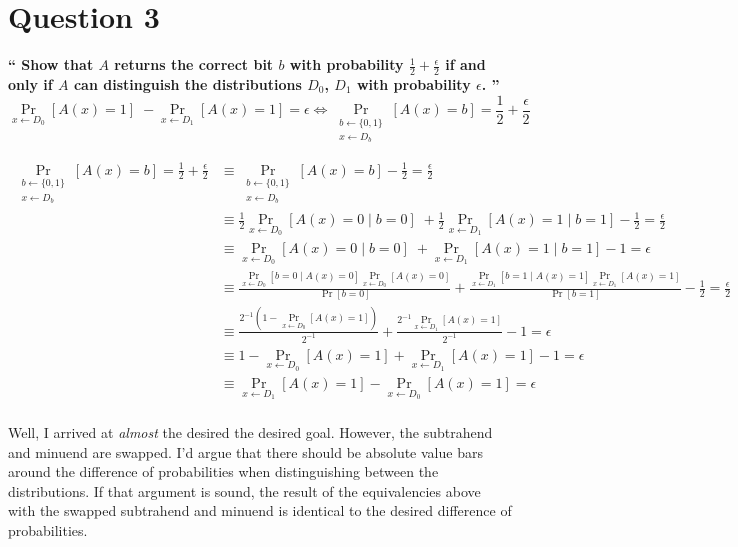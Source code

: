 \documentclass{article}
\newcommand{\HomeworkText}[1]{\textbf{``#1''}\\}
\begin{document}
	\clearpage
	\section*{Question 3}
	\HomeworkText{
		Show that $A$ returns the correct bit $b$ with probability $\frac{1}{2} + \frac{\epsilon}{2}$ if and only if $A$ can distinguish the distributions $D_0$, $D_1$ with probability $\epsilon$.
	}

    $$\underset{ x \gets D_0}{\Pr}[A(x) = 1] \;- \underset{ x \gets D_1}{\Pr}[A(x) = 1] = \epsilon \iff \underset{\substack{ b \gets \{0,1\}\\x \gets D_b}}{\Pr}[ A(x) = b] = \frac{1}{2} + \frac{\epsilon}{2}$$
    
    \begin{equation}
    \begin{split}
    \underset{\substack{ b \gets \{0,1\}\\x \gets D_b}}{\Pr}[ A(x) = b] = \frac{1}{2} + \frac{\epsilon}{2} & \equiv \underset{\substack{ b \gets \{0,1\}\\x \gets D_b}}{\Pr}[ A(x) = b] - \frac{1}{2} = \frac{\epsilon}{2}\\
    & \equiv \frac{1}{2}\underset{ x \gets D_0}{\Pr}[A(x) = 0 \;|\; b = 0] \; + \frac{1}{2}\underset{ x \gets D_1}{\Pr}[A(x) = 1 \;|\; b = 1] - \frac{1}{2} = \frac{\epsilon}{2} \\
    & \equiv \underset{ x \gets D_0}{\Pr}[A(x) = 0 \;|\; b = 0] \; + \underset{ x \gets D_1}{\Pr}[A(x) = 1 \;|\; b = 1] - 1 = \epsilon \\
    & \equiv \frac{\underset{ x \gets D_0}{\Pr}[b = 0 \;|\; A(x) = 0] \underset{ x \gets D_0}{\Pr}[A(x) = 0]}{\Pr[b = 0]} + \frac{\underset{ x \gets D_1}{\Pr}[b = 1 \;|\; A(x) = 1] \underset{ x \gets D_1}{\Pr}[A(x) = 1]}{\Pr[b = 1]} - \frac{1}{2} = \frac{\epsilon}{2} \\
    & \equiv \frac{2^{-1}(1 - \underset{ x \gets D_0}{\Pr}[A(x) = 1])}{2^{-1}} + \frac{2^{-1}\underset{ x \gets D_1}{\Pr}[A(x) = 1]}{2^{-1}} - 1 = \epsilon \\
    & \equiv 1 - \underset{ x \gets D_0}{\Pr}[A(x) = 1] + \underset{ x \gets D_1}{\Pr}[A(x) = 1] - 1 = \epsilon \\
    & \equiv \underset{ x \gets D_1}{\Pr}[A(x) = 1] - \underset{ x \gets D_0}{\Pr}[A(x) = 1] = \epsilon \\
    \end{split}
    \end{equation}
    
    Well, I arrived at \emph{almost} the desired the desired goal. However, the subtrahend and minuend are swapped. I'd argue that there should be absolute value bars around the difference of probabilities when distinguishing between the distributions. If that argument is sound, the result of the equivalencies above with the swapped subtrahend and minuend is identical to the desired difference of probabilities.
	
\end{document}
